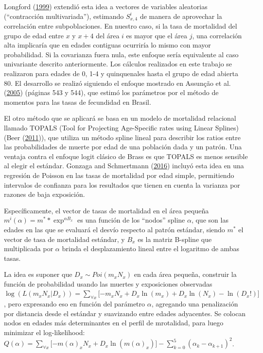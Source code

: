 \documentclass[12pt,]{article}
\begin{document}
Longford (\protect\hyperlink{ref-Longford1999}{1999}) extendió esta idea
a vectores de variables aleatorias (``contracción multivariada''),
estimando \(S_{x,4}^{i}\) de manera de aprovechar la correlación entre
subpoblaciones. En nuestro caso, si la tasa de mortalidad del grupo de
edad entre \(x\) y \(x+4\) del área \(i\) es mayor que el área \(j\),
una correlación alta implicaría que en edades contiguas ocurriría lo
mismo con mayor probabilidad. Si la covarianza fuera nula, este enfoque
sería equivalente al caso univariante descrito anteriormente. Los
cálculos realizados en este trabajo se realizaron para edades de 0, 1-4
y quinquenales hasta el grupo de edad abierta 80. El desarrollo se
realizó siguiendo el enfoque mostrado en Assunção et al.
(\protect\hyperlink{ref-Assuncao2005}{2005}) (páginas 543 y 544), que
estimó los parámetros por el método de momentos para las tasas de
fecundidad en Brasil.

El otro método que se aplicará se basa en un modelo de mortalidad
relacional llamado TOPALS (Tool for Projecting Age-Specific rates using
Linear Splines) (Beer (\protect\hyperlink{ref-deBeer2011}{2011})), que
utiliza un método spline lineal para describir los ratios entre las
probabilidades de muerte por edad de una población dada y un patrón. Una
ventaja contra el enfoque logit clásico de Brass es que TOPALS es menos
sensible al elegir el estándar. Gonzaga and Schmertmann
(\protect\hyperlink{ref-Gonzaga_Schmertmann_2016}{2016}) incluyó esta
idea en una regresión de Poisson en las tasas de mortalidad por edad
simple, permitiendo intervalos de confianza para los resultados que
tienen en cuenta la varianza por razones de baja exposición.

Específicamente, el vector de tasas de mortalidad en el área pequeña
\(m^{i}(\alpha) = m^{*}*\exp^{\alpha B_{x}}\) es una función de los
``nodos'' spline \(\alpha\), que son las edades en las que se evaluará
el desvío respecto al patrón estándar, siendo \(m^*\) el vector de tasa
de mortalidad estándar, y \(B_{x}\) es la matriz B-spline que
multiplicada por \(\alpha\) brinda el desplazamiento lineal entre el
logaritmo de ambas tasas.

La idea es suponer que \(D_{x}\sim Poi (m_ {x} N_ {x})\) en cada área
pequeña, construir la función de probabilidad usando las muertes y
exposiciones observadas
\(\log(L(m_{x}N_{x}|D_{x}))=\sum_{\forall x}{\lbrack -m_{x}N_{x}+D_{x}\ln (m_{x})+D_{x}\ln (N_{x})-\ln (D_{x}!)\rbrack}\),
pero expresando eso en función del parámetro \(\alpha\), agregando una
penalización por distancia desde el estándar y suavizando entre edades
adyacentes. Se colocan nodos en edades más determinantes en el perfil de
mrotalidad, para luego minimizar el log-likelihood:
\(Q(\alpha )=\sum_{\forall x}{\lbrack -m(\alpha )_{x}N_{x}+D_{x}\ln(m(\alpha )_{x})\rbrack }-\sum_{k=0}^{5}{(\alpha _{k}-\alpha _{k+1})^{2}}\).
\end{document}

